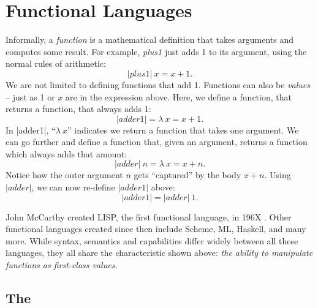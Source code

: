 \documentclass[12pt]{report}
\begin{document}


\chapter{Functional Languages}
\label{ref_chapter_languages}


Informally, a \emph{function} is a mathematical definition that takes
arguments and computes some result. For example, \emph{plus1} just adds 1 
to its argument, using the normal rules of arithmetic:
\begin{equation}
  |plus1|\ x = x + 1.
\end{equation}
We are not limited to defining functions that add 1. Functions can
also be \emph{values} -- just as 1 or $x$ are in the expression
above. Here, we define a function, that returns a function, that always
adds 1:
\begin{equation}
  |adder1| = \lambda\ x = x + 1.
\end{equation}
In |adder1|, ``$\lambda\ x$'' indicates we return a function that takes one
argument. We can go further and define a function that, given an
argument, returns a function which always adds that amount:
\begin{equation}
  |adder|\ n = \lambda\ x = x + n.
\end{equation}
Notice how the outer argument $n$ gets ``captured'' by the body $x +
n$. Using $|adder|$, we can now re-define $|adder1|$ above:
\begin{equation}
  |adder1| = |adder|\ 1.
\end{equation}

John McCarthy created LISP, the first functional language, in 196X
\citep{McCarthyXX}. Other functional languages created since then include 
Scheme, ML, Haskell, and many more. While syntax, semantics and capabilities
differ widely between all these languages, they all share the characteristic
shown above: \emph{the ability to manipulate functions as first-class values}.

\section{The \LamA}

\end{document}
